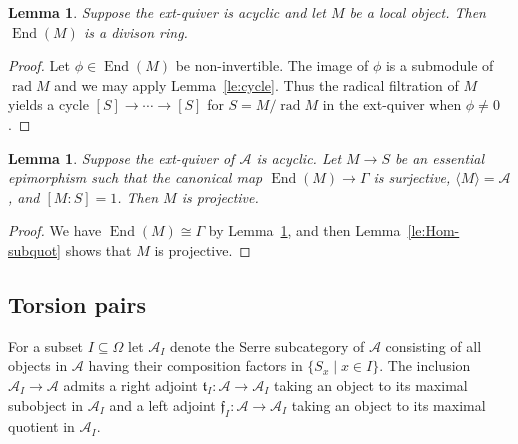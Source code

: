 \documentclass[a4paper]{amsart}
\theoremstyle{plain}
\newtheorem{lem}[thm]{Lemma}
\theoremstyle{definition}
\theoremstyle{remark}
\numberwithin{equation}{section}
\newcommand{\End}{\operatorname{End}}
\newcommand{\rad}{\operatorname{rad}}
\def\A{\mathcal A}
\newcommand{\frf}{\mathfrak{f}}
\newcommand{\frt}{\mathfrak{t}}
\def\p{\phi}
\def\Ga{\Gamma}
\begin{document}
\begin{lem}\label{le:End}
  Suppose the ext-quiver is acyclic and let $M$ be a local object.
  Then $\End(M)$ is a divison ring.
\end{lem}
\begin{proof}
  Let $\p\in\End(M)$ be non-invertible. The image of $\p$ is a
  submodule of $\rad M$ and we may apply Lemma~\ref{le:cycle}. Thus
  the radical filtration of $M$ yields a cycle $[S]\to \cdots \to [S]$
  for $S=M/\rad M$ in the ext-quiver when $\p\neq 0$.
\end{proof}


\begin{lem}\label{le:max}
  Suppose the ext-quiver of $\A$ is acyclic. Let $M\to S$ be an essential
  epimorphism such that the canonical map $\End(M)\to\Ga$ is surjective,
 $\langle M\rangle=\A$, and $[M:S]=1$. Then $M$ is projective.
\end{lem}
\begin{proof}
We have $\End(M)\cong \Ga$ by Lemma~\ref{le:End}, and
  then Lemma~\ref{le:Hom-subquot} shows that $M$ is projective.
\end{proof}  


\subsection*{Torsion pairs}

For a subset $I\subseteq \Omega$ let $\A_I$ denote the Serre
subcategory of $\A$ consisting of all objects in $\A$ having their
composition factors in $\{S_x\mid x\in I\}$. The inclusion $\A_I\to\A$
admits a right adjoint $\frt_I\colon \A\to\A_I$ taking an object to
its maximal subobject in $\A_I$ and a left adjoint
$\frf_I\colon \A\to\A_I$ taking an object to its maximal quotient in
$\A_I$.
\end{document}
